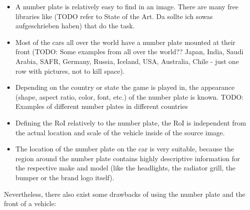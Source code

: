 \begin{itemize}
  \item A number plate is relatively easy to find in an image. There are many free libraries like (TODO refer to State of the Art. Da sollte ich sowas aufgeschrieben haben) that do the task.
  \item Most of the cars all over the world have a number plate mounted at their front (TODO: Some examples from all over the world?? Japan, India, Saudi Arabia, SAFR, Germany, Russia, Iceland, USA, Australia, Chile - just one row with pictures, not to kill space).
  \item Depending on the country or state the game is played in, the appearance (shape, aspect ratio, color, font, etc.) of the number plate is known. TODO: Examples of different number plates in different countries
  \item Defining the RoI relatively to the number plate, the RoI is independent from the actual location and scale of the vehicle inside of the source image.
  \item The location of the number plate on the car is very suitable, because the region around the number plate contains highly descriptive information for the respective make and model (like the headlights, the radiator grill, the bumper or the brand logo itself).
\end{itemize}
Nevertheless, there also exist some drawbacks of using the number plate and the front of a vehicle:


